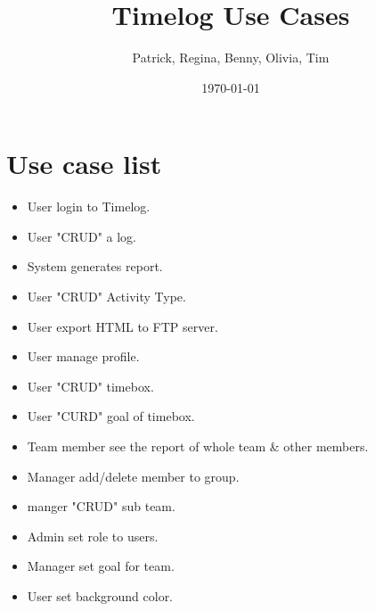 \documentclass[12pt, a4paper]{article}
\title{Timelog Use Cases}
\author{Patrick, Regina, Benny, Olivia, Tim}
\date{\today}
\begin{document}
\maketitle
\newpage

\tableofcontents
\newpage

\section{Use case list}
  \begin{itemize}
    \item User login to Timelog.
    \item User "CRUD" a log.
    \item System generates report.
    \item User "CRUD" Activity Type.
    \item User export HTML to FTP server.
    \item User manage profile.
    \item User "CRUD" timebox.
    \item User "CURD" goal of timebox.
    \item Team member see the report of whole team \& other members.
    \item Manager add/delete member to group.
    \item manger "CRUD" sub team.
    \item Admin set role to users.
    \item Manager set goal for team.
    \item User set background color.
  \end{itemize}
\end{document}
